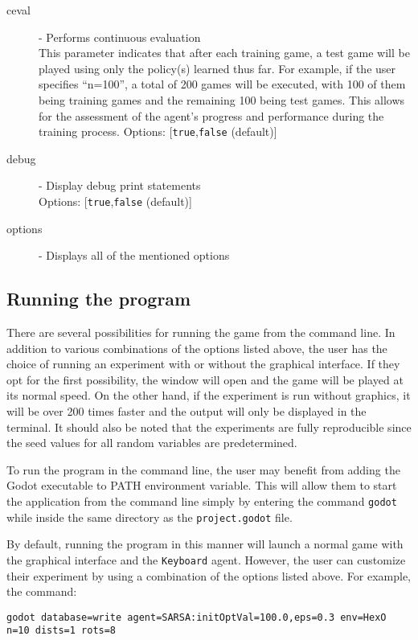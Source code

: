 \begin{description}
\item[ceval] - Performs continuous evaluation \label{opt:ceval}\\
This parameter indicates that after each training game, a test game will be played using only the policy(s) learned thus far. For example, if the user specifies ``n=100'', a total of 200 games will be executed, with 100 of them being training games and the remaining 100 being test games. This allows for the assessment of the agent's progress and performance during the training process. 
Options: [\texttt{true},\texttt{false} (default)]
\item[debug] - Display debug print statements \label{opt:debug}\\
Options: [\texttt{true},\texttt{false} (default)]
\item[options] - Displays all of the mentioned options \label{opt:options}\\
\end{description}

\subsection{Running the program}
There are several possibilities for running the game from the command line. In addition to various combinations of the options listed above, the user has the choice of running an experiment with or without the graphical interface. If they opt for the first possibility, the window will open and the game will be played at its normal speed. On the other hand, if the experiment is run without graphics, it will be over 200 times faster and the output will only be displayed in the terminal.
It should also be noted that the experiments are fully reproducible since the seed values for all random variables are predetermined.

To run the program in the command line, the user may benefit from adding the Godot executable to PATH environment variable. This will allow them to start the application from the command line simply by entering the command \texttt{godot} while inside the same directory as the \texttt{project.godot} file.

By default, running the program in this manner will launch a normal game with the graphical interface and the \texttt{Keyboard} agent. However, the user can customize their experiment by using a combination of the options listed above. For example, the command:
\begin{lstlisting}
godot database=write agent=SARSA:initOptVal=100.0,eps=0.3 env=HexO n=10 dists=1 rots=8
\end{lstlisting}

